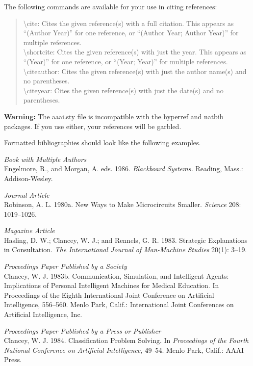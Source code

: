 \documentclass[letterpaper]{article}
\begin{document}
The following commands are available for your use in citing references:
\begin{quote}
\begin{small}
\textbackslash cite: Cites the given reference(s) with a full citation. This appears as ``(Author Year)'' for one reference, or ``(Author Year; Author Year)'' for multiple references.\\
\textbackslash shortcite: Cites the given reference(s) with just the year. This appears as ``(Year)'' for one reference, or ``(Year; Year)'' for multiple references.\\
\textbackslash citeauthor: Cites the given reference(s) with just the author name(s) and no parentheses.\\
\textbackslash citeyear: Cites the given reference(s) with just the date(s) and no parentheses.
\end{small}
\end{quote}

\textbf{Warning:} The aaai.sty file is incompatible with the hyperref and natbib packages. If you use either, your references will be garbled.

Formatted bibliographies should look like the following examples.

\smallskip \noindent \textit{Book with Multiple Authors}\\
Engelmore, R., and Morgan, A. eds. 1986. \textit{Blackboard Systems.} Reading, Mass.: Addison-Wesley.

\smallskip \noindent \textit{Journal Article}\\
Robinson, A. L. 1980a. New Ways to Make Microcircuits Smaller. \textit{Science} 208: 1019--1026.

\smallskip \noindent \textit{Magazine Article}\\
Hasling, D. W.; Clancey, W. J.; and Rennels, G. R. 1983. Strategic Explanations in Consultation. \textit{The International Journal of Man-Machine Studies} 20(1): 3--19.

\smallskip \noindent \textit{Proceedings Paper Published by a Society}\\
Clancey, W. J. 1983b. Communication, Simulation, and Intelligent Agents: Implications of Personal Intelligent Machines for Medical Education. In Proceedings of the Eighth International Joint Conference on Artificial Intelligence, 556--560. Menlo Park, Calif.: International Joint Conferences on Artificial Intelligence, Inc.

\smallskip \noindent \textit{Proceedings Paper Published by a Press or Publisher}\\
Clancey, W. J. 1984. Classification Problem Solving. In \textit{Proceedings of the Fourth National Conference on Artificial Intelligence,} 49--54. Menlo Park, Calif.: AAAI Press. 
\end{document}
